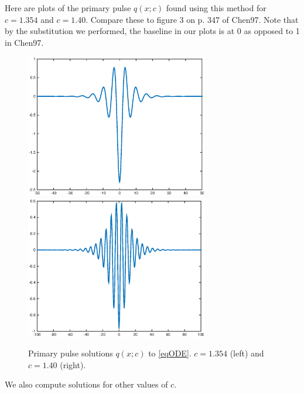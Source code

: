 \documentclass[12pt]{article}
\begin{document}
Here are plots of the primary pulse $q(x; c)$ found using this method for $c = 1.354$ and $c = 1.40$. Compare these to figure 3 on p. 347 of Chen97. Note that by the substitution we performed, the baseline in our plots is at 0 as opposed to 1 in Chen97.

\begin{figure}[H]
\centering
\includegraphics[width=8cm]{single1354.eps}
\includegraphics[width=8cm]{single14.eps}
\label{fig:single1}
\caption{Primary pulse solutions $q(x;c)$ to \eqref{eqODE}. $c = 1.354$ (left) and $c = 1.40$ (right).}
\end{figure}

We also compute solutions for other values of $c$.
\end{document}
